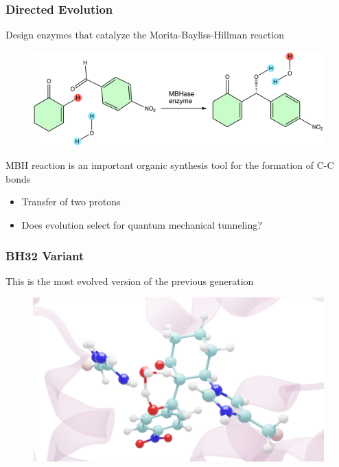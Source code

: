 \documentclass{beamer}
\begin{document}
\begin{frame}
\frametitle{Directed Evolution}
Design enzymes that catalyze the Morita-Bayliss-Hillman reaction
\begin{figure}
\centering
\includegraphics[scale=0.4]{figures/mbh-reaction.png}
\end{figure}
MBH reaction is an important organic synthesis tool for the formation of C-C bonds
\begin{itemize}[<+-|alert@+>]
\item{Transfer of two protons}
\item{Does evolution select for quantum mechanical tunneling?}
\end{itemize}
\end{frame}
\begin{frame}
\frametitle{BH32 Variant}
This is the most evolved version of the previous generation 
\begin{figure}
\centering
\includegraphics[scale=0.1]{figures/trans-120.png}
\end{figure}
\end{frame}
\end{document}
